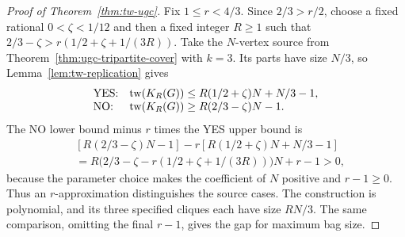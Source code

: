\begin{proof}[Proof of Theorem~\ref{thm:tw-ugc}]
Fix $1\le r<4/3$. Since $2/3>r/2$, choose a fixed rational
$0<\zeta<1/12$ and then a fixed integer $R\ge1$ such that
$2/3-\zeta>r(1/2+\zeta+1/(3R))$.
Take the $N$-vertex source from Theorem~\ref{thm:ugc-tripartite-cover}
with $k=3$. Its parts have size $N/3$, so
Lemma~\ref{lem:tw-replication} gives
\[
 \begin{array}{ll}
 \textup{YES:}&\operatorname{tw}(K_R(G))
       \le R(1/2+\zeta)N+N/3-1,\\
 \textup{NO:}&\operatorname{tw}(K_R(G))
       \ge R(2/3-\zeta)N-1.
 \end{array}
\]
The NO lower bound minus $r$ times the YES upper bound is
\[
\begin{aligned}
 &[R(2/3-\zeta)N-1]
   -r[R(1/2+\zeta)N+N/3-1]\\
 &=R\bigl(2/3-\zeta-r(1/2+\zeta+1/(3R))\bigr)N+r-1>0,
\end{aligned}
\]
because the parameter choice makes the coefficient of $N$ positive
and $r-1\ge0$. Thus an $r$-approximation
distinguishes the source cases. The construction is polynomial,
and its three specified cliques each have size $RN/3$. The same
comparison, omitting the final $r-1$, gives the gap for maximum
bag size.
\end{proof}
